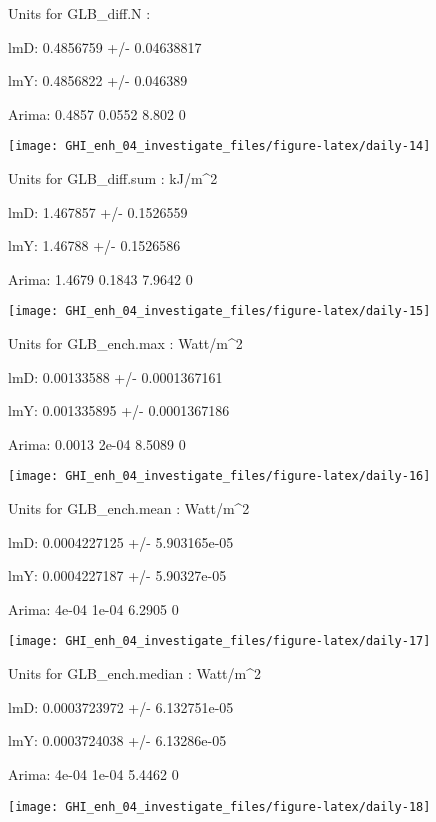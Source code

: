 \documentclass[
  10pt,
  a4paper,oneside]{article}
\begin{document}
Units for GLB\_diff.N :

lmD: 0.4856759 +/- 0.04638817

lmY: 0.4856822 +/- 0.046389

Arima: 0.4857 0.0552 8.802 0

\begin{center}\texttt{[image: GHI\_enh\_04\_investigate\_files/figure-latex/daily-14]} \end{center}

Units for GLB\_diff.sum : kJ/m\^{}2

lmD: 1.467857 +/- 0.1526559

lmY: 1.46788 +/- 0.1526586

Arima: 1.4679 0.1843 7.9642 0

\begin{center}\texttt{[image: GHI\_enh\_04\_investigate\_files/figure-latex/daily-15]} \end{center}

Units for GLB\_ench.max : Watt/m\^{}2

lmD: 0.00133588 +/- 0.0001367161

lmY: 0.001335895 +/- 0.0001367186

Arima: 0.0013 2e-04 8.5089 0

\begin{center}\texttt{[image: GHI\_enh\_04\_investigate\_files/figure-latex/daily-16]} \end{center}

Units for GLB\_ench.mean : Watt/m\^{}2

lmD: 0.0004227125 +/- 5.903165e-05

lmY: 0.0004227187 +/- 5.90327e-05

Arima: 4e-04 1e-04 6.2905 0

\begin{center}\texttt{[image: GHI\_enh\_04\_investigate\_files/figure-latex/daily-17]} \end{center}

Units for GLB\_ench.median : Watt/m\^{}2

lmD: 0.0003723972 +/- 6.132751e-05

lmY: 0.0003724038 +/- 6.13286e-05

Arima: 4e-04 1e-04 5.4462 0

\begin{center}\texttt{[image: GHI\_enh\_04\_investigate\_files/figure-latex/daily-18]} \end{center}
\end{document}
